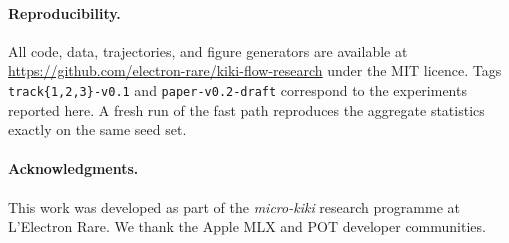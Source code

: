 \documentclass[11pt]{article}
\begin{document}
\paragraph{Reproducibility.}
All code, data, trajectories, and figure generators are available at
\url{https://github.com/electron-rare/kiki-flow-research} under the MIT
licence. Tags \texttt{track\{1,2,3\}-v0.1} and \texttt{paper-v0.2-draft}
correspond to the experiments reported here. A fresh run of the fast
path reproduces the aggregate statistics exactly on the same seed set.

\paragraph{Acknowledgments.}
This work was developed as part of the \emph{micro-kiki} research
programme at L'Electron Rare. We thank the Apple MLX and POT developer
communities.



\end{document}
